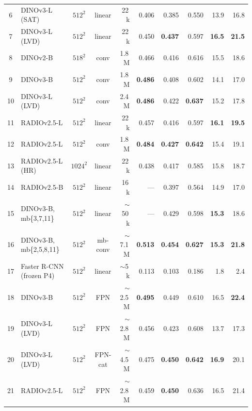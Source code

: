 \begin{table}[t]
\begin{tabular}{clccr rrrrr}
 6 & DINOv3-L (SAT)         & $512^2$      & linear  & 22\,k        & 0.406 & 0.385 & 0.550 & 13.9 & 16.8 \\
 7 & DINOv3-L (LVD)         & $512^2$      & linear  & 22\,k        & 0.450 & \textbf{0.437} & 0.597 & \textbf{16.5} & \textbf{21.5} \\
 8 & DINOv2-B               & $518^2$      & conv    & 1.8\,M       & 0.466 & 0.416 & 0.616 & 15.5 & 18.6 \\
 9 & DINOv3-B               & $512^2$      & conv    & 1.8\,M       & \textbf{0.486} & 0.408 & 0.602 & 14.1 & 17.0 \\
10 & DINOv3-L (LVD)         & $512^2$      & conv    & 2.4\,M       & \textbf{0.486} & 0.422 & \textbf{0.637} & 15.2 & 17.8 \\
\midrule
11 & RADIOv2.5-L            & $512^2$      & linear  & 22\,k        & 0.457 & 0.416 & 0.597 & \textbf{16.1} & \textbf{19.5} \\
12 & RADIOv2.5-L            & $512^2$      & conv    & 1.8\,M       & \textbf{0.484} & \textbf{0.427} & \textbf{0.642} & 15.4 & 19.1 \\
13 & RADIOv2.5-L (HR)       & $1024^2$     & linear  & 22\,k        & 0.438 & 0.417 & 0.585 & 15.8 & 18.7 \\
14 & RADIOv2.5-B            & $512^2$      & linear  & 16\,k        & ---   & 0.397 & 0.564 & 14.9 & 17.0 \\
\midrule
15 & DINOv3-B, mb\{3,7,11\} & $512^2$      & linear  & $\sim$50\,k  & ---   & 0.429 & 0.598 & \textbf{15.3} & 18.6 \\
16 & DINOv3-B, mb\{2,5,8,11\} & $512^2$    & mb-conv & $\sim$7.1\,M & \textbf{0.513} & \textbf{0.454} & \textbf{0.627} & \textbf{15.3} & \textbf{21.8} \\
\midrule
17 & Faster R-CNN (frozen P4) & $512^2$    & linear  & $\sim$5\,k   & 0.113 & 0.103 & 0.186 &  1.8 &  2.4 \\
18 & DINOv3-B               & $512^2$      & FPN     & $\sim$2.5\,M & \textbf{0.495} & 0.449 & 0.610 & 16.5 & \textbf{22.4} \\
19 & DINOv3-L (LVD)         & $512^2$      & FPN     & $\sim$2.8\,M & 0.456 & 0.423 & 0.608 & 13.7 & 17.3 \\
20 & DINOv3-L (LVD)         & $512^2$      & FPN-cat & $\sim$4.5\,M & 0.475 & \textbf{0.450} & \textbf{0.642} & \textbf{16.9} & 20.1 \\
21 & RADIOv2.5-L            & $512^2$      & FPN     & $\sim$2.8\,M & 0.459 & \textbf{0.450} & 0.636 & 16.5 & 21.4 \\

\end{tabular}
\end{table}

